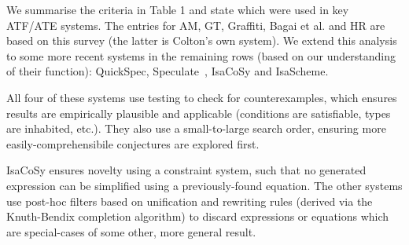 %
%
%
%


We summarise the criteria in Table 1 and state which were used in key
ATF/ATE systems. The entries for AM, GT, Graffiti, Bagai et al. and HR are based
on this survey (the latter is Colton's own system). We extend this analysis to
some more recent systems in the remaining rows (based on our understanding of
their function): QuickSpec, Speculate~\cite{braquehais2017speculate}, IsaCoSy
and IsaScheme.

All four of these systems use testing to check for counterexamples, which
ensures results are empirically plausible and applicable (conditions are
satisfiable, types are inhabited, etc.). They also use a small-to-large search
order, ensuring more easily-comprehensibile conjectures are explored first.

IsaCoSy ensures novelty using a constraint system, such that no generated
expression can be simplified using a previously-found equation. The other
systems use post-hoc filters based on unification and rewriting rules
(derived via the Knuth-Bendix completion algorithm) to discard expressions or
equations which are special-cases of some other, more general result.

